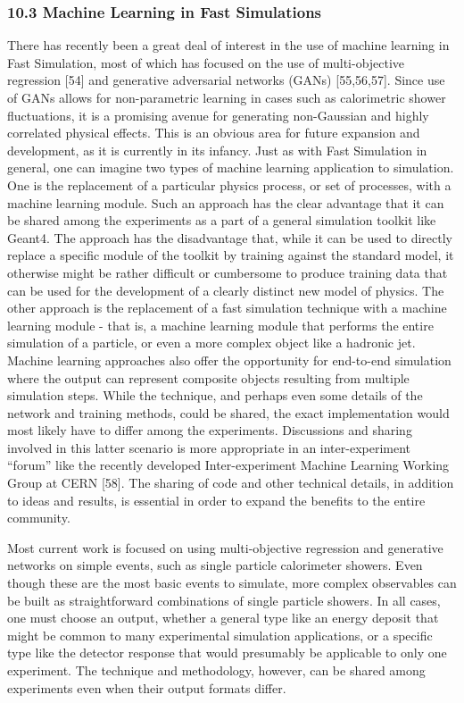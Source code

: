 \documentclass[12pt,a4paper]{article}
\begin{document}
\hypertarget{machine-learning-in-fast-simulations}{%
\subsubsection{10.3 Machine Learning in Fast
Simulations}\label{machine-learning-in-fast-simulations}}

There has recently been a great deal of interest in the use of machine
learning in Fast Simulation, most of which has focused on the use of
multi-objective regression {[}54{]} and generative adversarial networks
(GANs) {[}55,56,57{]}. Since use of GANs allows for non-parametric
learning in cases such as calorimetric shower fluctuations, it is a
promising avenue for generating non-Gaussian and highly correlated
physical effects. This is an obvious area for future expansion and
development, as it is currently in its infancy. Just as with Fast
Simulation in general, one can imagine two types of machine learning
application to simulation. One is the replacement of a particular
physics process, or set of processes, with a machine learning module.
Such an approach has the clear advantage that it can be shared among the
experiments as a part of a general simulation toolkit like Geant4. The
approach has the disadvantage that, while it can be used to directly
replace a specific module of the toolkit by training against the
standard model, it otherwise might be rather difficult or cumbersome to
produce training data that can be used for the development of a clearly
distinct new model of physics. The other approach is the replacement of
a fast simulation technique with a machine learning module - that is, a
machine learning module that performs the entire simulation of a
particle, or even a more complex object like a hadronic jet. Machine
learning approaches also offer the opportunity for end-to-end simulation
where the output can represent composite objects resulting from multiple
simulation steps. While the technique, and perhaps even some details of
the network and training methods, could be shared, the exact
implementation would most likely have to differ among the experiments.
Discussions and sharing involved in this latter scenario is more
appropriate in an inter-experiment ``forum'' like the recently developed
Inter-experiment Machine Learning Working Group at CERN {[}58{]}. The
sharing of code and other technical details, in addition to ideas and
results, is essential in order to expand the benefits to the entire
community.

Most current work is focused on using multi-objective regression and
generative networks on simple events, such as single particle
calorimeter showers. Even though these are the most basic events to
simulate, more complex observables can be built as straightforward
combinations of single particle showers. In all cases, one must choose
an output, whether a general type like an energy deposit that might be
common to many experimental simulation applications, or a specific type
like the detector response that would presumably be applicable to only
one experiment. The technique and methodology, however, can be shared
among experiments even when their output formats differ.
\end{document}
